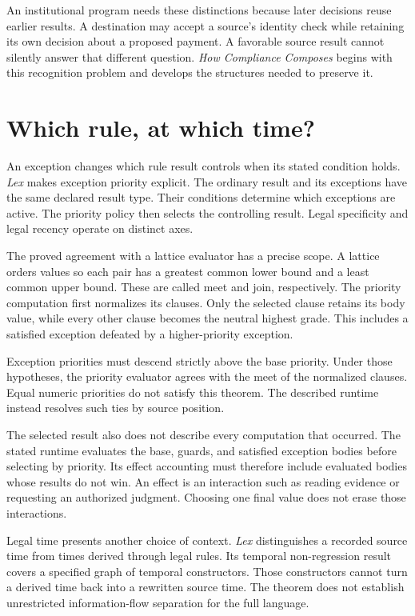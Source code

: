 \documentclass{momentum}
\begin{document}
An institutional program needs these distinctions because later decisions reuse earlier results. A destination may accept a source's identity check while retaining its own decision about a proposed payment. A favorable source result cannot silently answer that different question. \emph{How Compliance Composes} begins with this recognition problem and develops the structures needed to preserve it. \cite[Section~1]{composes}

\section{Which rule, at which time?}

An exception changes which rule result controls when its stated condition holds. \emph{Lex} makes exception priority explicit. The ordinary result and its exceptions have the same declared result type. Their conditions determine which exceptions are active. The priority policy then selects the controlling result. Legal specificity and legal recency operate on distinct axes. \cite[Sections~3.1 and~4.4]{lex}

The proved agreement with a lattice evaluator has a precise scope. A lattice orders values so each pair has a greatest common lower bound and a least common upper bound. These are called meet and join, respectively. The priority computation first normalizes its clauses. Only the selected clause retains its body value, while every other clause becomes the neutral highest grade. This includes a satisfied exception defeated by a higher-priority exception.

Exception priorities must descend strictly above the base priority. Under those hypotheses, the priority evaluator agrees with the meet of the normalized clauses. Equal numeric priorities do not satisfy this theorem. The described runtime instead resolves such ties by source position. \cite[Section~7.4, priority evaluator agreement]{lex}

The selected result also does not describe every computation that occurred. The stated runtime evaluates the base, guards, and satisfied exception bodies before selecting by priority. Its effect accounting must therefore include evaluated bodies whose results do not win. An effect is an interaction such as reading evidence or requesting an authorized judgment. Choosing one final value does not erase those interactions. \cite[Sections~3.1 and~4.3]{lex}

Legal time presents another choice of context. \emph{Lex} distinguishes a recorded source time from times derived through legal rules. Its temporal non-regression result covers a specified graph of temporal constructors. Those constructors cannot turn a derived time back into a rewritten source time. The theorem does not establish unrestricted information-flow separation for the full language. \cite[Section~3.2, temporal rule-graph non-regression]{lex}
\end{document}
